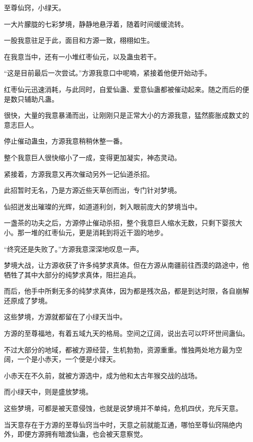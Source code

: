 
\begin{this_body}

至尊仙窍，小绿天。

一大片朦胧的七彩梦境，静静地悬浮着，随着时间缓缓流转。

一股我意驻足于此，面目和方源一致，栩栩如生。

在我意当中，还有一小堆红枣仙元，以及蛊虫若干。

“这是目前最后一次尝试。”方源我意口中呢喃，紧接着他便开始动手。

红枣仙元迅速消耗，与此同时，自爱仙蛊、爱意仙蛊都被催动起来。随之而后的便是数只辅助凡蛊。

很快，大量的我意暴涌而出，让刚刚只是正常大小的方源我意，猛然膨胀成数丈的意志巨人。

停止催动蛊虫，方源我意稍稍休整一番。

整个我意巨人很快缩小了一成，变得更加凝实，神态灵动。

紧接着，方源我意又再次催动另外一记仙道杀招。

此招暂时无名，乃是方源近些天草创而出，专门针对梦境。

仙招迸发出璀璨的光辉，如道道利剑，刺入眼前庞大的梦境当中。

一盏茶的功夫之后，方源停止催动杀招，整个我意巨人缩水无数，只剩下婴孩大小。那一堆的红枣仙元，更是消耗到将近干涸的地步。

“终究还是失败了。”方源我意深深地叹息一声。

梦境大战，让方源收获了许多纯梦求真体。但在方源从南疆前往西漠的路途中，他牺牲了其中大部分的纯梦求真体，阻拦追兵。

而后，他手中所剩无多的纯梦求真体，因为都是残次品，都是到达时限，各自崩解还原成了梦境。

这些梦境，方源就都留在了小绿天当中。

方源的至尊福地，有着五域九天的格局。空间之辽阔，说出去可以吓坏世间蛊仙。

不过大部分的地域，都被方源经营，生机勃勃，资源重重。惟独两处地方最为空阔，一个是小赤天，一个便是小绿天。

小赤天在不久前，就被方源选中，成为他和太古年猴交战的战场。

而小绿天中，则是盛放梦境。

这些梦境，可都是被天意侵蚀，也就是说梦境并不单纯，危机四伏，充斥天意。

当天意存在于方源的至尊仙窍当中时，天意之前就能互通，哪怕至尊仙窍隔绝内外，即便方源拥有暗渡仙蛊，也会被天意察觉。


\end{this_body}
